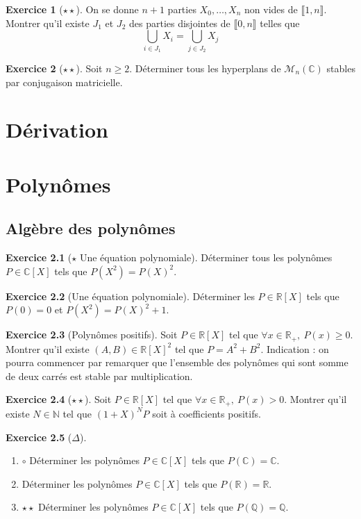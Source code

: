 \documentclass[french]{book}
\newcommand{\N}{\mathbb{N}}
\newcommand{\Q}{\mathbb{Q}}
\newcommand{\R}{\mathbb{R}}
\newcommand{\C}{\mathbb{C}}
\theoremstyle{definition}
\newtheorem{ex}{Exercice}[chapter]
\theoremstyle{theorem}
\theoremstyle{remark}
\begin{document}
\begin{ex}[$\star\star$]
	On se donne $n+1$ parties $X_0,\ldots,X_n$ non vides de $\llbracket1,n\rrbracket$. Montrer qu'il existe $J_1$ et $J_2$ des parties disjointes de $\llbracket0,n\rrbracket$ telles que $$\bigcup_{i\in J_1}X_i=\bigcup_{j\in J_2} X_j$$
\end{ex}

\begin{ex}[$\star\star$]
	Soit $n\geqslant 2$. Déterminer tous les hyperplans de $\mathcal{M}_n(\C)$ stables par conjugaison matricielle.
\end{ex}

\chapter{Dérivation}



\chapter{Polynômes}

\section{Algèbre des polynômes}

\begin{ex}[$\star$ Une équation polynomiale]
	Déterminer tous les polynômes $P\in\C[X]$ tels que $P(X^2)=P(X)^2$.
\end{ex}

\begin{ex}[Une équation polynomiale]
	Déterminer les $P\in\R[X]$ tels que $P(0)=0$ et $P(X^2)=P(X)^2+1$.
\end{ex}

\begin{ex}[Polynômes positifs]
	Soit $P\in\R[X]$ tel que $\forall x\in\R_+,\ P(x)\geqslant 0$. Montrer qu'il existe $(A,B)\in\R[X]^2$ tel que $P=A^2+B^2$. Indication : on pourra commencer par remarquer que l'ensemble des polynômes qui sont somme de deux carrés est stable par multiplication.
\end{ex}

\begin{ex}[$\star\star$]
	Soit $P\in\R[X]$ tel que $\forall x\in\R_+,\ P(x)>0$. Montrer qu'il existe $N\in\N$ tel que $(1+X)^NP$ soit à coefficients positifs.
\end{ex}

\begin{ex}[$\Delta$]
	\begin{enumerate}
		\item $\circ$ Déterminer les polynômes $P\in\C[X]$ tels que $P(\C)=\C$.
		\item Déterminer les polynômes $P\in\C[X]$ tels que $P(\R)=\R$.
		\item $\star\star$ Déterminer les polynômes $P\in\C[X]$ tels que $P(\Q)=\Q$.
	\end{enumerate}
\end{ex}
\end{document}
